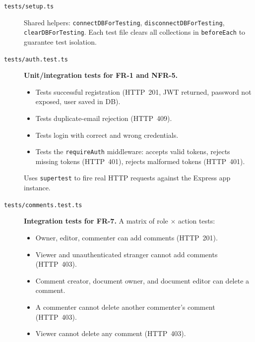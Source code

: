 \documentclass{scrartcl}
\begin{document}
  \begin{description}
    \item[\texttt{tests/setup.ts}] Shared helpers: \texttt{connectDBForTesting},
    \texttt{disconnectDBForTesting}, \texttt{clearDBForTesting}. Each test file clears all
    collections in \texttt{beforeEach} to guarantee test isolation.

    \item[\texttt{tests/auth.test.ts}] \textbf{Unit/integration tests for FR-1 and NFR-5.}
    \begin{itemize}
      \item Tests successful registration (HTTP~201, JWT returned, password not exposed,
      user saved in DB).
      \item Tests duplicate-email rejection (HTTP~409).
      \item Tests login with correct and wrong credentials.
      \item Tests the \texttt{requireAuth} middleware: accepts valid tokens, rejects missing
      tokens (HTTP~401), rejects malformed tokens (HTTP~401).
    \end{itemize}
    Uses \texttt{supertest} to fire real HTTP requests against the Express app instance.

    \item[\texttt{tests/comments.test.ts}] \textbf{Integration tests for FR-7.}
    A matrix of role $\times$ action tests:
    \begin{itemize}
      \item Owner, editor, commenter can add comments (HTTP~201).
      \item Viewer and unauthenticated stranger cannot add comments (HTTP~403).
      \item Comment creator, document owner, and document editor can delete a comment.
      \item A commenter cannot delete another commenter's comment (HTTP~403).
      \item Viewer cannot delete any comment (HTTP~403).
    \end{itemize}


\end{description}
\end{document}
